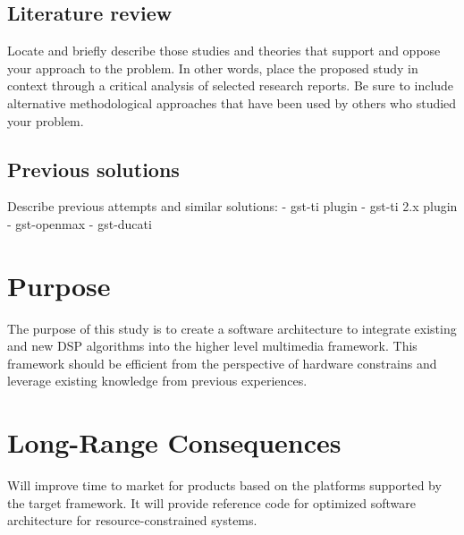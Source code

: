 \subsection{Literature review}
Locate and briefly describe those studies and theories that support and oppose your approach to the problem. In other words, place the proposed study in context through a critical analysis of selected research reports.
Be sure to include alternative methodological approaches that have been used by others who studied your problem.

\subsection{Previous solutions}
Describe previous attempts and similar solutions:
- gst-ti plugin
- gst-ti 2.x plugin
- gst-openmax
- gst-ducati

\section{Purpose}
The purpose of this study is to create a software architecture to integrate existing and new DSP algorithms into the higher level multimedia framework. This framework should be efficient from the perspective of hardware constrains and leverage existing knowledge from previous experiences.

\section{Long-Range Consequences}
Will improve time to market for products based on the platforms supported by the target framework. It will provide reference code for optimized software architecture for resource-constrained systems.
